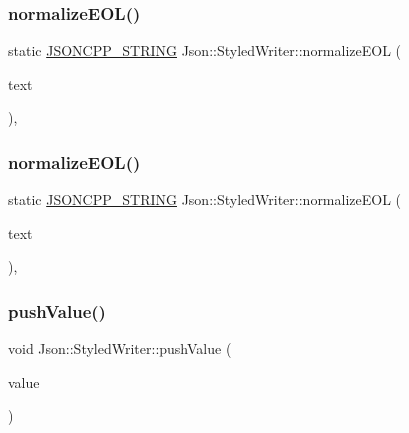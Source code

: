 \subsubsection{\texorpdfstring{normalize\+E\+O\+L()}{normalizeEOL()}\hspace{0.1cm}{\footnotesize\ttfamily [1/2]}}
{\footnotesize\ttfamily static \hyperlink{config_8h_a1e723f95759de062585bc4a8fd3fa4be}{J\+S\+O\+N\+C\+P\+P\+\_\+\+S\+T\+R\+I\+NG} Json\+::\+Styled\+Writer\+::normalize\+E\+OL (\begin{DoxyParamCaption}\item[{const \hyperlink{config_8h_a1e723f95759de062585bc4a8fd3fa4be}{J\+S\+O\+N\+C\+P\+P\+\_\+\+S\+T\+R\+I\+NG} \&}]{text }\end{DoxyParamCaption})\hspace{0.3cm}{\ttfamily [static]}, {\ttfamily [private]}}

\hypertarget{class_json_1_1_styled_writer_a692dda1b1621fb5620e0a7b1b10f3b1f}{}\label{class_json_1_1_styled_writer_a692dda1b1621fb5620e0a7b1b10f3b1f} 
\subsubsection{\texorpdfstring{normalize\+E\+O\+L()}{normalizeEOL()}\hspace{0.1cm}{\footnotesize\ttfamily [2/2]}}
{\footnotesize\ttfamily static \hyperlink{config_8h_a1e723f95759de062585bc4a8fd3fa4be}{J\+S\+O\+N\+C\+P\+P\+\_\+\+S\+T\+R\+I\+NG} Json\+::\+Styled\+Writer\+::normalize\+E\+OL (\begin{DoxyParamCaption}\item[{const \hyperlink{config_8h_a1e723f95759de062585bc4a8fd3fa4be}{J\+S\+O\+N\+C\+P\+P\+\_\+\+S\+T\+R\+I\+NG} \&}]{text }\end{DoxyParamCaption})\hspace{0.3cm}{\ttfamily [static]}, {\ttfamily [private]}}

\hypertarget{class_json_1_1_styled_writer_a236a833b4bdaa09915c2cac715970f08}{}\label{class_json_1_1_styled_writer_a236a833b4bdaa09915c2cac715970f08} 
\subsubsection{\texorpdfstring{push\+Value()}{pushValue()}\hspace{0.1cm}{\footnotesize\ttfamily [1/2]}}
{\footnotesize\ttfamily void Json\+::\+Styled\+Writer\+::push\+Value (\begin{DoxyParamCaption}\item[{const \hyperlink{config_8h_a1e723f95759de062585bc4a8fd3fa4be}{J\+S\+O\+N\+C\+P\+P\+\_\+\+S\+T\+R\+I\+NG} \&}]{value }\end{DoxyParamCaption})\hspace{0.3cm}{\ttfamily [private]}}

